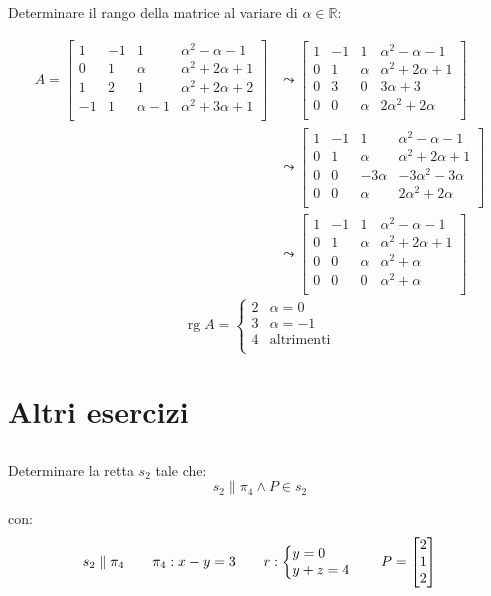 \documentclass{article}
\makeatletter
\newcommand*{\m}[1]{\begin{bmatrix}#1\end{bmatrix}}
\newcommand*{\sys}[1]{\left\{\begin{array}{@{}l@{}}#1\end{array}\right.}
\DeclareMathOperator{\rg}{rg}  %
\makeatother
\begin{document}
\subsection{}
Determinare il rango della matrice al variare di $\alpha\in\mathbb{R}$:

\[\begin{aligned}A=\m{
    1&-1&1&\alpha^2-\alpha-1\\
    0&1&\alpha&\alpha^2+2\alpha+1\\
    1&2&1&\alpha^2+2\alpha+2\\
    -1&1&\alpha-1&\alpha^2+3\alpha+1\\
}&\leadsto\m{
    1&-1&1&\alpha^2-\alpha-1\\
    0&1&\alpha&\alpha^2+2\alpha+1\\
    0&3&0&3\alpha+3\\
    0&0&\alpha&2\alpha^2+2\alpha\\
}\\&\leadsto\m{
    1&-1&1&\alpha^2-\alpha-1\\
    0&1&\alpha&\alpha^2+2\alpha+1\\
    0&0&-3\alpha&-3\alpha^2-3\alpha\\
    0&0&\alpha&2\alpha^2+2\alpha\\
}\\&\leadsto\m{
    1&-1&1&\alpha^2-\alpha-1\\
    0&1&\alpha&\alpha^2+2\alpha+1\\
    0&0&\alpha&\alpha^2+\alpha\\
    0&0&0&\alpha^2+\alpha\\
}
\end{aligned}\]
\[\rg{A}=\begin{cases}
    2&\alpha=0\\
    3&\alpha=-1\\
    4&\text{altrimenti}\\
\end{cases}\]

\section{Altri esercizi}
\subsection{}
Determinare la retta $s_2$ tale che:
\[s_2\parallel\pi_4\wedge P\in s_2\]

con:
\[
    s_2\parallel\pi_4\qquad
    \pi_4:x-y=3\qquad
    r:\sys{y=0\\y+z=4}
    \qquad P=\m{2\\1\\2}
\]
\end{document}
